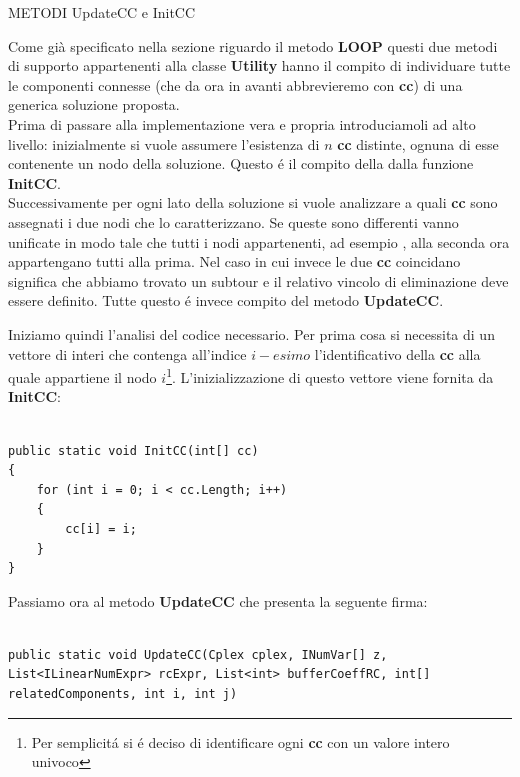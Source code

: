 \documentclass[11pt]{article}
\begin{document}
\vspace{2\baselineskip}
METODI UpdateCC e InitCC
\vspace{2\baselineskip}

Come già specificato nella sezione riguardo il metodo \textbf{LOOP} questi due metodi di supporto appartenenti alla classe \textbf{Utility} hanno il compito di individuare tutte le componenti connesse (che da ora in avanti abbrevieremo con \textbf{cc}) di una generica soluzione proposta.\\
Prima di passare alla implementazione vera e propria introduciamoli ad alto livello: inizialmente si vuole assumere l'esistenza di $n$ \textbf{cc} distinte, ognuna di esse contenente un nodo della soluzione. Questo \'e il compito della dalla funzione \textbf{InitCC}.\\
Successivamente per ogni lato della soluzione si vuole analizzare a quali \textbf{cc} sono assegnati i due nodi che lo caratterizzano. Se queste sono differenti vanno unificate in modo tale che tutti i nodi appartenenti, ad esempio
, alla seconda ora appartengano tutti alla prima. Nel caso in cui invece le due \textbf{cc} coincidano significa che abbiamo trovato un subtour e il relativo vincolo di eliminazione deve essere definito. Tutte questo \'e invece compito del metodo \textbf{UpdateCC}.

Iniziamo quindi l'analisi del codice necessario. Per prima cosa si necessita di un vettore di interi che contenga all'indice $i-esimo$ l'identificativo della \textbf{cc} alla quale appartiene il nodo $i$\footnote{Per semplicit\'a si \'e deciso di identificare ogni \textbf{cc} con un valore intero univoco}. L'inizializzazione di questo vettore viene fornita da \textbf{InitCC}:

\begin{lstlisting}

public static void InitCC(int[] cc)
{
	for (int i = 0; i < cc.Length; i++)
	{
		cc[i] = i;
	}
}

\end{lstlisting}

Passiamo ora al metodo \textbf{UpdateCC} che presenta la seguente firma:

\begin{lstlisting}

public static void UpdateCC(Cplex cplex, INumVar[] z, List<ILinearNumExpr> rcExpr, List<int> bufferCoeffRC, int[] relatedComponents, int i, int j)

\end{lstlisting}
\end{document}
